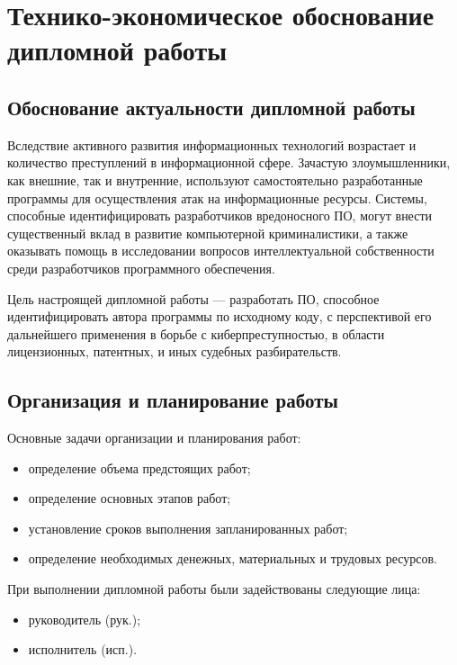 % 
% 
% 
%  
% 


\renewcommand{\ESKDcolumnI}{\ESKDfontIII Технико-экономическое обоснование дипломной работы}


\section{Технико-экономическое обоснование дипломной работы}
\subsection{Обоснование актуальности дипломной работы}

Вследствие активного развития информационных технологий возрастает и количество преступлений в информационной сфере.
Зачастую злоумышленники, как внешние, так и внутренние, используют самостоятельно разработанные программы для осуществления 
атак на информационные ресурсы.
Системы, способные идентифицировать разработчиков вредоносного ПО, могут внести существенный вклад в развитие компьютерной
криминалистики, а также оказывать помощь в исследовании вопросов интеллектуальной собственности среди разработчиков программного
обеспечения.

Цель настроящей дипломной работы --- разработать ПО, способное идентифицировать автора программы по исходному коду, с перспективой его
дальнейшего применения в борьбе с киберпреступностью, в области лицензионных, патентных, и иных судебных разбирательств.


\subsection{Организация и планирование работы}

Основные задачи организации и планирования работ:
\begin{itemize}
 \item определение объема предстоящих работ;
 \item определение основных этапов работ;
 \item установление сроков выполнения запланированных работ;
 \item определение необходимых денежных, материальных и трудовых ресурсов.
\end{itemize}


При выполнении дипломной работы были задействованы следующие лица:
\begin{itemize}
 \item руководитель (рук.);
 \item исполнитель (исп.).
\end{itemize}

